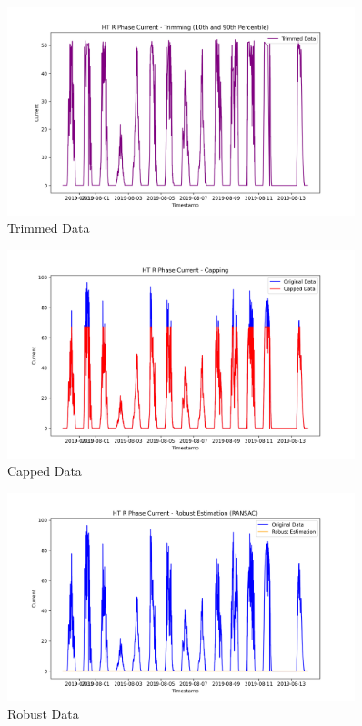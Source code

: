 \begin{figure}[H]
	\centering
	\includegraphics[width=0.9\textwidth]{./Images/trimmed_data.png}
	\caption{Trimmed Data}
\end{figure}

\begin{figure}[H]
	\centering
	\includegraphics[width=0.9\textwidth]{./Images/capped_data.png}
	\caption{Capped Data}
\end{figure}

\begin{figure}[H]
	\centering
	\includegraphics[width=0.9\textwidth]{./Images/robust_estimation_data.png}
	\caption{Robust Data}
\end{figure}

